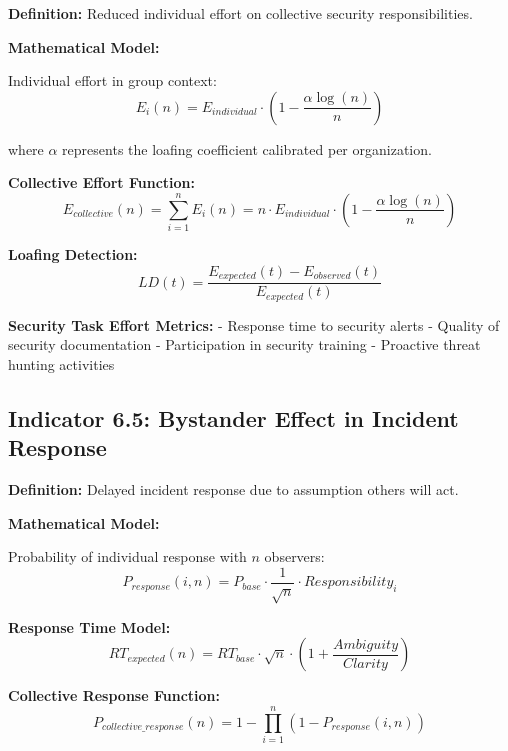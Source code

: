 \documentclass[11pt,a4paper]{article}
\begin{document}
\textbf{Definition:} Reduced individual effort on collective security responsibilities.

\textbf{Mathematical Model:}

Individual effort in group context:
\begin{equation}
E_i(n) = E_{individual} \cdot \left(1 - \frac{\alpha \log(n)}{n}\right)
\end{equation}

where $\alpha$ represents the loafing coefficient calibrated per organization.

\textbf{Collective Effort Function:}
\begin{equation}
E_{collective}(n) = \sum_{i=1}^n E_i(n) = n \cdot E_{individual} \cdot \left(1 - \frac{\alpha \log(n)}{n}\right)
\end{equation}

\textbf{Loafing Detection:}
\begin{equation}
LD(t) = \frac{E_{expected}(t) - E_{observed}(t)}{E_{expected}(t)}
\end{equation}

\textbf{Security Task Effort Metrics:}
- Response time to security alerts
- Quality of security documentation
- Participation in security training
- Proactive threat hunting activities

\subsection{Indicator 6.5: Bystander Effect in Incident Response}

\textbf{Definition:} Delayed incident response due to assumption others will act.

\textbf{Mathematical Model:}

Probability of individual response with $n$ observers:
\begin{equation}
P_{response}(i,n) = P_{base} \cdot \frac{1}{\sqrt{n}} \cdot Responsibility_i
\end{equation}

\textbf{Response Time Model:}
\begin{equation}
RT_{expected}(n) = RT_{base} \cdot \sqrt{n} \cdot \left(1 + \frac{Ambiguity}{Clarity}\right)
\end{equation}

\textbf{Collective Response Function:}
\begin{equation}
P_{collective\_response}(n) = 1 - \prod_{i=1}^n (1 - P_{response}(i,n))
\end{equation}
\end{document}
